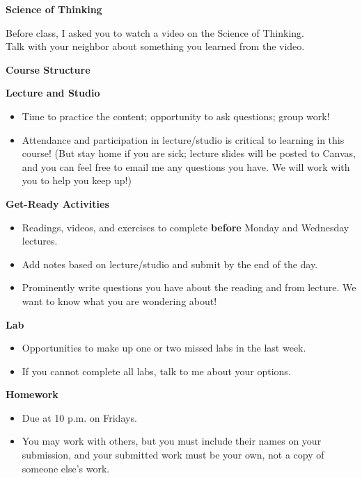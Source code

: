 \documentclass[]{article}
\begin{document}
\begin{PresentSpace}
\begin{center}
	\textbf{Science of Thinking}
\end{center}
Before class, I asked you to watch a video on the Science of Thinking. \\

\noindent Talk with your neighbor about something you learned from the video.
\vspace{0.5cm}
\begin{center}
	\textbf{Course Structure}
\end{center}
\noindent\textbf{Lecture and Studio}
\begin{itemize}
\item Time to practice the content; opportunity to ask questions; group work!
\item Attendance and participation in lecture/studio is critical to learning in this course! (But stay home if you are sick; lecture slides will be posted to Canvas, and you can feel free to email me any questions you have. We will work with you to help you keep up!)
\end{itemize}
\noindent\textbf{Get-Ready Activities}
\begin{itemize}
	\item Readings, videos, and exercises to complete \textbf{before} Monday and Wednesday lectures.
	\item Add notes based on lecture/studio and submit by the end of the day.
	\item Prominently write questions you have about the reading and from lecture. We want to know what you are wondering about!
\end{itemize}
\noindent\textbf{Lab}
\begin{itemize}
	\item Opportunities to make up one or two missed labs in the last week.
	\item If you cannot complete all labs, talk to me about your options.
\end{itemize}
\noindent\textbf{Homework}
\begin{itemize}
	\item Due at 10 p.m. on Fridays.
	\item You may work with others, but you must include their names on your submission, and your submitted work must be your own, not a copy of someone else's work.
\end{itemize}
\end{PresentSpace}
\end{document}
